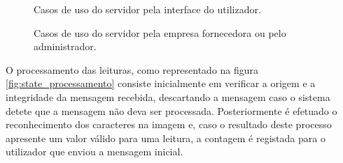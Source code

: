 \vspace{3.5cm} %

\begin{figure}[h!]
\begin{center}
\caption{Casos de uso do servidor pela interface do utilizador.}
\label{fig:uso_serv1}
\end{center}
\end{figure}

\begin{figure}[h!]
\begin{center}
\caption{Casos de uso do servidor pela empresa fornecedora ou pelo administrador.}
\label{fig:uso_serv2}
\end{center}
\end{figure}

\vspace{1cm}%

O processamento das leituras, como representado na figura \ref{fig:state_processamento} consiste inicialmente em verificar a origem e a integridade da mensagem recebida, descartando a mensagem caso o sistema detete que a mensagem não deva ser processada. Posteriormente é efetuado o reconhecimento dos caracteres na imagem e, caso o resultado deste processo apresente um valor válido para uma leitura, a contagem é registada para o utilizador que enviou a mensagem inicial.

